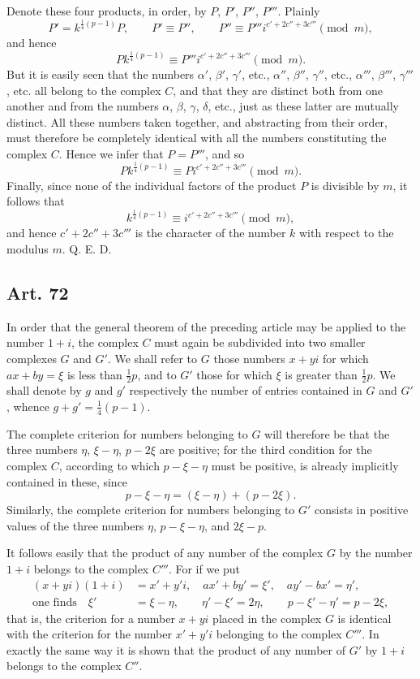 \documentclass[12pt]{article}
\newcommand{\art}[1]{\subsection*{Art. #1}}
\begin{document}
Denote these four products, in order, by $P$, $P'$, $P''$, $P'''$. Plainly
\[
P'=k^{\frac14(p-1)}P,\qquad
P'\equiv P'',\qquad
P''\equiv P'''i^{c'+2c''+3c'''}\pmod m,
\]
and hence
\[
Pk^{\frac14(p-1)}\equiv P'''i^{c'+2c''+3c'''}\pmod m.
\]
But it is easily seen that the numbers $\alpha'$, $\beta'$, $\gamma'$, etc., $\alpha''$, $\beta''$, $\gamma''$, etc., $\alpha'''$, $\beta'''$, $\gamma'''$, etc. all belong to the complex $C$, and that they are distinct both from one another and from the numbers $\alpha$, $\beta$, $\gamma$, $\delta$, etc., just as these latter are mutually distinct. All these numbers taken together, and abstracting from their order, must therefore be completely identical with all the numbers constituting the complex $C$. Hence we infer that $P=P'''$, and so
\[
Pk^{\frac14(p-1)}\equiv Pi^{c'+2c''+3c'''}\pmod m.
\]
Finally, since none of the individual factors of the product $P$ is divisible by $m$, it follows that
\[
k^{\frac14(p-1)}\equiv i^{c'+2c''+3c'''}\pmod m,
\]
and hence $c'+2c''+3c'''$ is the character of the number $k$ with respect to the modulus $m$. Q. E. D.

\art{72}
In order that the general theorem of the preceding article may be applied to the number $1+i$, the complex $C$ must again be subdivided into two smaller complexes $G$ and $G'$. We shall refer to $G$ those numbers $x+yi$ for which $ax+by=\xi$ is less than $\frac12p$, and to $G'$ those for which $\xi$ is greater than $\frac12p$. We shall denote by $g$ and $g'$ respectively the number of entries contained in $G$ and $G'$, whence $g+g'=\frac14(p-1)$.

The complete criterion for numbers belonging to $G$ will therefore be that the three numbers $\eta$, $\xi-\eta$, $p-2\xi$ are positive; for the third condition for the complex $C$, according to which $p-\xi-\eta$ must be positive, is already implicitly contained in these, since
\[
p-\xi-\eta=(\xi-\eta)+(p-2\xi).
\]
Similarly, the complete criterion for numbers belonging to $G'$ consists in positive values of the three numbers $\eta$, $p-\xi-\eta$, and $2\xi-p$.

It follows easily that the product of any number of the complex $G$ by the number $1+i$ belongs to the complex $C'''$. For if we put
\[
\begin{aligned}
(x+yi)(1+i)&=x'+y'i, \quad
ax'+by'=\xi',\quad ay'-bx'=\eta',\\
\text{one finds}\quad
\xi'&=\xi-\eta,\qquad
\eta'-\xi'=2\eta,\qquad
p-\xi'-\eta'=p-2\xi,
\end{aligned}
\]
that is, the criterion for a number $x+yi$ placed in the complex $G$ is identical with the criterion for the number $x'+y'i$ belonging to the complex $C'''$. In exactly the same way it is shown that the product of any number of $G'$ by $1+i$ belongs to the complex $C''$.
\end{document}
